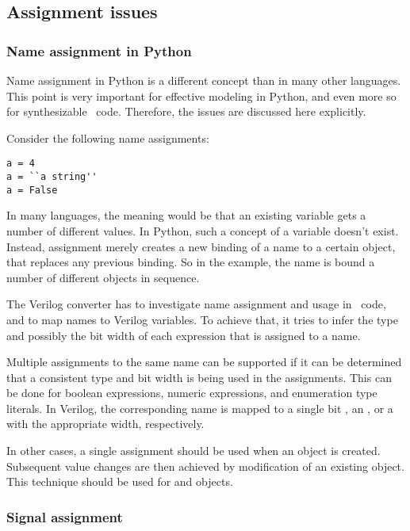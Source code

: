 \subsection{Assignment issues\label{conv-meth-assign}}

\subsubsection{Name assignment in Python\label{conv-meth-assign-python}}

Name assignment in Python is a different concept than in
many other languages. This point is very important for
effective modeling in Python, and even more so
for synthesizable \myhdl\ code. Therefore, the issues are
discussed here explicitly.

Consider the following name assignments:

\begin{verbatim}
a = 4
a = ``a string''
a = False
\end{verbatim}

In many languages, the meaning would be that an
existing variable  gets a number of different values.
In Python, such a concept of a variable doesn't exist. Instead,
assignment merely creates a new binding of a name to a
certain object, that replaces any previous binding.
So in the example, the name  is bound a 
number of different objects in sequence.

The Verilog converter has to investigate name
assignment and usage in \myhdl\ code, and to map
names to Verilog variables. To achieve that,
it tries to infer the type and possibly the
bit width of each expression that is assigned
to a name.

Multiple assignments to the same name can be supported if it can be
determined that a consistent type and bit width is being used in the
assignments. This can be done for boolean expressions, numeric
expressions, and enumeration type literals. In Verilog, the
corresponding name is mapped to a single bit , an
, or a  with the appropriate width, respectively.

In other cases, a single assignment should be used when an object is
created. Subsequent value changes are then achieved by modification of
an existing object.  This technique should be used for 
and  objects.

\subsubsection{Signal assignment\label{conv-meth-assign-signal}}

